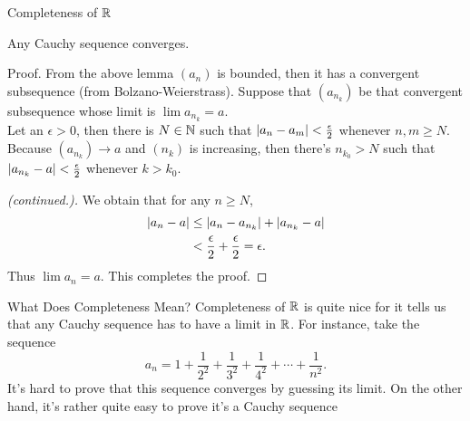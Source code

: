\documentclass{beamer}
\begin{document}
\begin{frame}{Completeness of $\R$}
  \begin{theorem}[Completeness of $\R$]
    Any Cauchy sequence converges.
  \end{theorem}
  \pause
  \begin{block}{Proof.}
    From the above lemma $(a_n)$ is bounded, then it has a convergent
    subsequence (from Bolzano-Weierstrass). Suppose that 
    $(a_{n_k})$ be that convergent subsequence
    whose limit is $\lim a_{n_k}=a$. \\[0.3cm]
    \pause
    Let an $\epsilon>0$, then there is $N\in\N$ such that
    $\lvert a_n-a_m\rvert<\frac{\epsilon}{2}$ whenever $n,m\geq N$.
    \pause
    Because $(a_{n_k})\to a$ and $(n_k)$ is increasing, then
    there's $n_{k_0}>N$ such that 
    $\lvert a_{n_k}-a\rvert<\frac{\epsilon}{2}$ whenever $k>k_0$.
  \end{block}
\end{frame}
\begin{frame}
  \begin{proof}[(continued.)]
    We obtain that for any $n\geq N$,
    \begin{align*}
      \lvert a_n-a\rvert
      &\leq \lvert a_n-a_{n_k}\rvert+\lvert a_{n_k}-a\rvert\\
      &<\frac{\epsilon}{2}+\frac{\epsilon}{2}=\epsilon.
    \end{align*}
    \pause
    Thus $\lim a_n=a$. This completes the proof.
  \end{proof}
\end{frame}
\begin{frame}{What Does Completeness Mean?}
  Completeness of $\R$ is quite nice for it tells us that
  any Cauchy sequence has to have a limit in  $\R$.
  For instance, take the sequence
  \[a_n=1+\frac{1}{2^2}+\frac{1}{3^2}+\frac{1}{4^2}+\cdots+\frac{1}{n^2}.\]
  It's hard to prove that this sequence converges by guessing its limit.
  On the other hand, it's rather quite easy to prove it's a Cauchy sequence
\end{frame}

\end{document}
